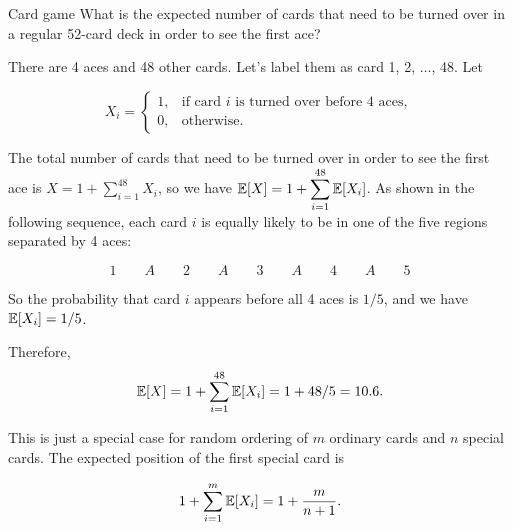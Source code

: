 \begin{problem}{Card game}
What is the expected number of cards that need to be turned over in a regular 52-card deck
in order to see the first ace?

\end{problem}
\begin{solution}
There are 4 aces and 48 other cards. Let's label them as card 1, 2, $\ldots$, 48. Let

\[
X_i=\begin{cases}
1, & \text{if card $i$ is turned over before 4 aces},\\
0, & \text{otherwise}.
\end{cases}
\]

The total number of cards that need to be turned over in order to see the first ace is
$X=1+\displaystyle\sum_{i=1}^{48}X_i$, so we have
$\mathbb{E}[X]=1+\displaystyle\sum_{i=1}^{48}\mathbb{E}[X_i]$. As shown in the following sequence,
each card $i$ is equally likely to be in one of the five regions separated by 4 aces:

\[
1\qquad A\qquad 2\qquad A\qquad 3\qquad A\qquad 4\qquad A\qquad 5
\]

So the probability that card $i$ appears before all 4 aces is $1/5$, and we have
$\mathbb{E}[X_i]=1/5$.

Therefore,
\[
\mathbb{E}[X]=1+\sum_{i=1}^{48}\mathbb{E}[X_i]=1+48/5=10.6.
\]

This is just a special case for random ordering of $m$ ordinary cards and $n$ special
cards. The expected position of the first special card is

\[
1+\sum_{i=1}^{m}\mathbb{E}[X_i]=1+\frac{m}{n+1}.
\]
\end{solution}

